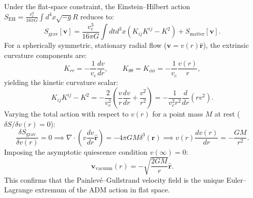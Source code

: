 Under the flat-space constraint, the Einstein--Hilbert action $S_{\mathrm{EH}} = \frac{v_c^3}{16\pi G} \int d^4x \sqrt{-g} R$ reduces to:
\begin{equation}
    S_{\mathrm{grav}}[\mathbf{v}] = \frac{v_c^3}{16\pi G} \int dt d^3x \left( K_{ij} K^{ij} - K^2 \right) + S_{\mathrm{matter}}[\mathbf{v}].
    \label{eq:adm_grav_eylem}
\end{equation}
For a spherically symmetric, stationary radial flow ($\mathbf{v} = v(r) \hat{\mathbf{r}}$), the extrinsic curvature components are:
\begin{equation}
    K_{rr} = -\frac{1}{v_c} \frac{dv}{dr}, \qquad K_{\theta\theta} = K_{\phi\phi} = -\frac{1}{v_c} \frac{v(r)}{r},
\end{equation}
yielding the kinetic curvature scalar:
\begin{equation}
    K_{ij} K^{ij} - K^2 = -\frac{2}{v_c^2} \left( \frac{v}{r} \frac{dv}{dr} + \frac{v^2}{r^2} \right) = -\frac{1}{v_c^2 r^2} \frac{d}{dr}\left( r v^2 \right).
    \label{eq:kinetik_egrilik_ozdeslik}
\end{equation}
Varying the total action with respect to $v(r)$ for a point mass $M$ at rest ($\delta S / \delta v(r) = 0$):
\begin{equation}
    \frac{\delta S_{\mathrm{grav}}}{\delta v(r)} = 0 \implies \nabla \cdot \left( v \frac{dv}{dr} \hat{\mathbf{r}} \right) = -4\pi G M \delta^3(\mathbf{r}) \implies v(r) \frac{dv(r)}{dr} = -\frac{GM}{r^2}.
    \label{eq:varyasyon_akis_sonuc}
\end{equation}
Imposing the asymptotic quiescence condition $v(\infty) = 0$:
\begin{equation}
    \mathbf{v}_{\mathrm{vacuum}}(r) = -\sqrt{\frac{2GM}{r}} \hat{\mathbf{r}}.
    \label{eq:vakum_cekis_hizi}
\end{equation}
This confirms that the Painlevé--Gullstrand velocity field is the unique Euler--Lagrange extremum of the ADM action in flat space.

